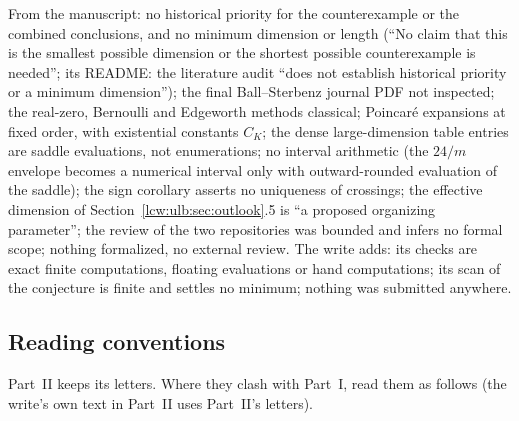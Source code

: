 \documentclass[11pt,letterpaper]{article}
\theoremstyle{remark}\newtheorem{remark}[theorem]{Remark}
\begin{document}
From the manuscript: no historical priority for the counterexample or the
combined conclusions, and no minimum dimension or length (``No claim that
this is the smallest possible dimension or the shortest possible
counterexample is needed''; its README: the literature audit ``does not
establish historical priority or a minimum dimension''); the final
Ball--Sterbenz journal PDF not inspected; the real-zero, Bernoulli and
Edgeworth methods classical; Poincar\'e expansions at fixed order, with
existential constants $C_K$; the dense large-dimension table entries are
saddle evaluations, not enumerations; no interval arithmetic (the $24/m$
envelope becomes a numerical interval only with outward-rounded evaluation
of the saddle); the sign corollary asserts no uniqueness of crossings; the
effective dimension of Section~\ref{lcw:ulb:sec:outlook}.5 is ``a proposed
organizing parameter''; the review of the two repositories was bounded and
infers no formal scope; nothing formalized, no external review. The write
adds: its checks are exact finite computations, floating evaluations or hand
computations; its scan of the conjecture is finite and settles no minimum;
nothing was submitted anywhere.

\subsection{Reading conventions}\label{lcw:ulb:sec:notation}

Part~II keeps its letters. Where they clash with Part~I, read them as follows
(the write's own text in Part~II uses Part~II's letters).
\end{document}
